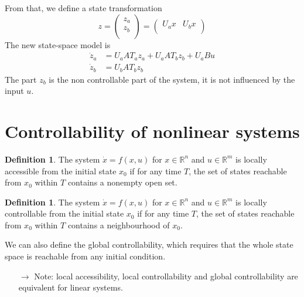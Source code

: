 \documentclass[12pt, openany]{report}
\theoremstyle{definition}
\newtheorem{definition}[thm]{Definition}
\newcommand{\R}{\mathbb{R}}
\begin{document}
From that, we define a state transformation 
\begin{equation}
    z = \begin{pmatrix}
        z_a \\ z_b\\
    \end{pmatrix} = \begin{pmatrix}
        U_ax & U_bx\\
    \end{pmatrix}
\end{equation}
The new state-space model is 
\begin{align}
    \dot z_a &= U_aAT_az_a + U_aAT_bz_b + U_aBu\\
    \dot z_b &= U_bAT_bz_b
\end{align}
The part \(z_b\) is the non controllable part of the system, it is not influenced by the input \(u\).
\section{Controllability of nonlinear systems}
\begin{definition}
    The system \(\dot x = f(x,u)\) for \(x\in \R^n\) and \(u\in \R^m\) is locally accessible from the initial state \(x_0\) if for any time \(T\), the set of states reachable from \(x_0\) within \(T\) contains a nonempty open set.
\end{definition}
\begin{definition}
    The system \(\dot x=f(x,u)\) for \(x\in \R^n\) and \(u\in \R^m\) is locally controllable from the initial state \(x_0\) if for any time \(T\), the set of states reachable from \(x_0\) within \(T\) contains a neighbourhood of \(x_0\). 
\end{definition}
We can also define the global controllability, which requires that the whole state space is reachable from any initial condition. 
\begin{itemize}
    \item [\(\rightarrow\)] Note: local accessibility, local controllability and global controllability are equivalent for linear systems.
\end{itemize}
\end{document}
